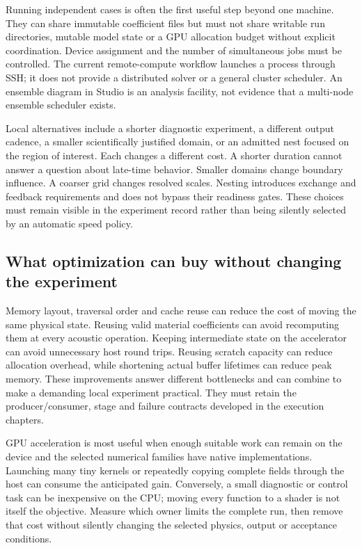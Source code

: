 Running independent cases is often the first useful step beyond one machine.
They can share immutable coefficient files but must not share writable run
directories, mutable model state or a GPU allocation budget without explicit
coordination. Device assignment and the number of simultaneous jobs must be
controlled. The current remote-compute workflow launches a process through
SSH; it does not provide a distributed solver or a general cluster scheduler.
An ensemble diagram in Studio is an analysis facility, not evidence that a
multi-node ensemble scheduler exists.

Local alternatives include a shorter diagnostic experiment, a different output
cadence, a smaller scientifically justified domain, or an admitted nest focused
on the region of interest. Each changes a different cost. A shorter duration
cannot answer a question about late-time behavior. Smaller domains change
boundary influence. A coarser grid changes resolved scales. Nesting introduces
exchange and feedback requirements and does not bypass their readiness gates.
These choices must remain visible in the experiment record rather than being
silently selected by an automatic speed policy.

\subsection{What optimization can buy without changing the experiment}

Memory layout, traversal order and cache reuse can reduce the cost of moving
the same physical state. Reusing valid material coefficients can avoid
recomputing them at every acoustic operation. Keeping intermediate state on
the accelerator can avoid unnecessary host round trips. Reusing scratch
capacity can reduce allocation overhead, while shortening actual buffer
lifetimes can reduce peak memory. These improvements answer different
bottlenecks and can combine to make a demanding local experiment practical.
They must retain the producer/consumer, stage and failure contracts developed
in the execution chapters.

GPU acceleration is most useful when enough suitable work can remain on the
device and the selected numerical families have native implementations.
Launching many tiny kernels or repeatedly copying complete fields through
the host can consume the anticipated gain. Conversely, a small diagnostic or
control task can be inexpensive on the CPU; moving every function to a shader
is not itself the objective. Measure which owner limits the complete run,
then remove that cost without silently changing the selected physics, output
or acceptance conditions.

